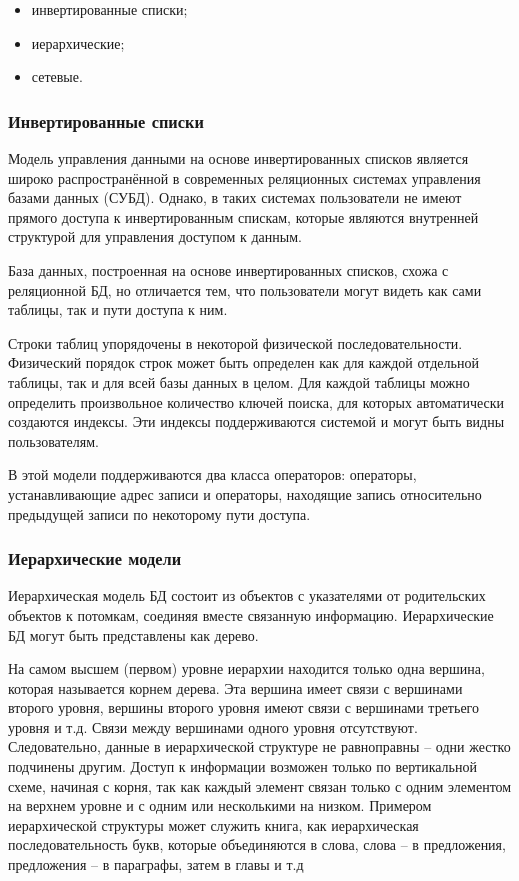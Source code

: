 \begin{itemize}[label=--]
    \item инвертированные списки;
    \item иерархические;
    \item сетевые.
\end{itemize}

\subsubsection{Инвертированные списки}
Модель управления данными на основе инвертированных списков является широко распространённой в современных реляционных системах управления базами данных (СУБД)\cite{кузнецов1998основы}. Однако, в таких системах пользователи не имеют прямого доступа к инвертированным спискам, которые являются внутренней структурой для управления доступом к данным.

База данных, построенная на основе инвертированных списков, схожа с реляционной БД, но отличается тем, что пользователи могут видеть как сами таблицы, так и пути доступа к ним.

Строки таблиц упорядочены в некоторой физической последовательности.
Физический порядок строк может быть определен как для каждой отдельной таблицы, так и для всей базы данных в целом.
Для каждой таблицы можно определить произвольное количество ключей поиска, для которых автоматически создаются индексы. Эти индексы поддерживаются системой и могут быть видны пользователям.

В этой модели поддерживаются два класса операторов: операторы, устанавливающие адрес записи и операторы, находящие запись относительно предыдущей записи по некоторому пути доступа.


\subsubsection{Иерархические модели}
Иерархическая модель БД состоит из объектов с указателями от родительских объектов к потомкам, соединяя вместе 
связанную информацию. Иерархические БД могут быть представлены как дерево.

На самом высшем (первом) уровне иерархии находится только одна
вершина, которая называется корнем дерева. Эта вершина имеет связи с вершинами второго уровня, вершины второго уровня имеют
связи с вершинами третьего уровня и т.д. Связи между вершинами одного уровня отсутствуют. Следовательно, данные в иерархической
структуре не равноправны – одни жестко подчинены другим. Доступ к информации возможен только по вертикальной схеме, начиная с
корня, так как каждый элемент связан только с одним элементом на верхнем уровне и с одним или несколькими на низком. Примером иерархической структуры может служить книга, как иерархическая последовательность букв, которые объединяются в слова,
слова – в предложения, предложения – в параграфы, затем в главы и т.д


